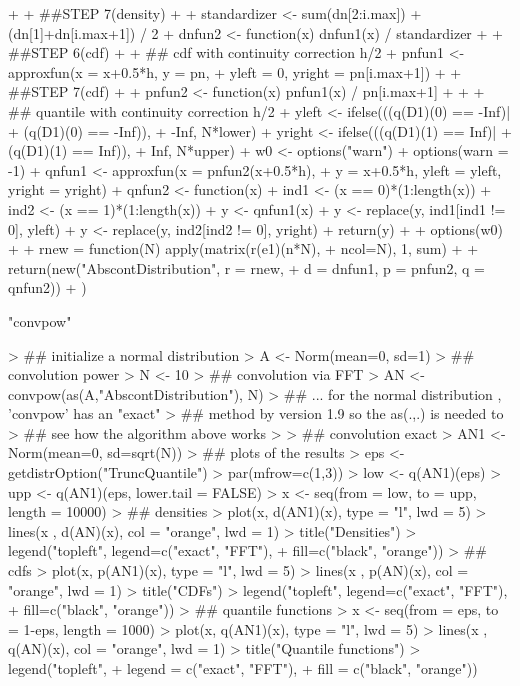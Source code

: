 \documentclass[11pt]{article}
\begin{document}
\begin{Schunk}
\begin{Sinput}
{+ 
+     ##STEP 7(density)
+  
+             standardizer <- sum(dn[2:i.max]) + (dn[1]+dn[i.max+1]) / 2
+             dnfun2 <- function(x) dnfun1(x) / standardizer
+ 
+     ##STEP 6(cdf)
+     
+             ## cdf with continuity correction h/2
+             pnfun1 <- approxfun(x = x+0.5*h, y = pn, 
+                         yleft = 0, yright = pn[i.max+1])
+ 
+     ##STEP 7(cdf)
+    
+             pnfun2 <- function(x) pnfun1(x) / pn[i.max+1]
+ 
+ 
+             ## quantile with continuity correction h/2
+             yleft <- ifelse(((q(D1)(0) == -Inf)|
+                              (q(D1)(0) == -Inf)), 
+                              -Inf, N*lower)
+             yright <- ifelse(((q(D1)(1) == Inf)|
+                               (q(D1)(1) == Inf)), 
+                               Inf, N*upper)    
+             w0 <- options("warn")
+             options(warn = -1)
+             qnfun1 <- approxfun(x = pnfun2(x+0.5*h), 
+                         y = x+0.5*h, yleft = yleft, yright = yright)
+             qnfun2 <- function(x){ 
+             ind1 <- (x == 0)*(1:length(x))
+             ind2 <- (x == 1)*(1:length(x))
+             y <- qnfun1(x)
+             y <- replace(y, ind1[ind1 != 0], yleft)
+             y <- replace(y, ind2[ind2 != 0], yright)
+             return(y)
+             }
+             options(w0)
+ 
+             rnew = function(N) apply(matrix(r(e1)(n*N), 
+                                      ncol=N), 1, sum)
+ 
+             return(new("AbscontDistribution", r = rnew, 
+                        d = dnfun1, p = pnfun2, q = qnfun2))
+ })
\end{Sinput}
\begin{Soutput}
[1] "convpow"
\end{Soutput}
\begin{Sinput}
> ## initialize a normal distribution
> A <- Norm(mean=0, sd=1)
> ## convolution power
> N <- 10 
> ## convolution via FFT
> AN <- convpow(as(A,"AbscontDistribution"), N)
> ##  ... for the normal distribution , 'convpow' has an "exact"
> ##      method by version 1.9 so the as(.,.)  is needed to
> ##      see how the algorithm above works
> 
> ## convolution exact
> AN1 <- Norm(mean=0, sd=sqrt(N))
> ## plots of the results
> eps <- getdistrOption("TruncQuantile")
> par(mfrow=c(1,3))
> low <- q(AN1)(eps)
> upp <- q(AN1)(eps, lower.tail = FALSE)
> x <- seq(from = low, to = upp, length = 10000)
> ## densities
> plot(x, d(AN1)(x), type = "l", lwd = 5)
> lines(x , d(AN)(x), col = "orange", lwd = 1)
> title("Densities")
> legend("topleft", legend=c("exact", "FFT"), 
+         fill=c("black", "orange"))
> ## cdfs
> plot(x, p(AN1)(x), type = "l", lwd = 5)
> lines(x , p(AN)(x), col = "orange", lwd = 1)
> title("CDFs")
> legend("topleft", legend=c("exact", "FFT"), 
+         fill=c("black", "orange"))
> ## quantile functions
> x <- seq(from = eps, to = 1-eps, length = 1000)
> plot(x, q(AN1)(x), type = "l", lwd = 5)
> lines(x , q(AN)(x), col = "orange", lwd = 1) 
> title("Quantile functions")
> legend("topleft", 
+        legend = c("exact", "FFT"), 
+         fill = c("black", "orange"))
\end{Sinput}
\end{Schunk}
\end{document}

